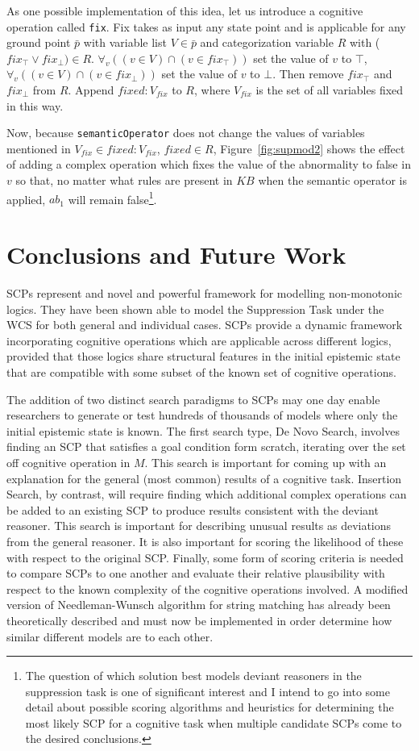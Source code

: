 \documentclass{article}
\begin{document}
 As one possible implementation of this idea, let us introduce a cognitive operation called \texttt{fix}. Fix takes as input any state point and is applicable for any ground point $\bar{p}$ with variable list $V \in \bar{p}$ and categorization variable $R$ with ($fix_\top \lor fix_\bot) \in R$. $\forall_v( (v \in V) \cap (v \in fix_\top))$ set the value of $v$ to $\top$, $\forall_v( (v \in V) \cap (v \in fix_\bot))$ set the value of $v$ to $\bot$. Then remove $fix_\top$ and $fix_\bot$ from $R$. Append $fixed:V_{fix}$ to $R$, where $V_{fix}$ is the set of all variables fixed in this way.

Now, because \texttt{semanticOperator} does not change the values of variables mentioned in $V_{fix} \in fixed:V_{fix}$, $fixed \in R$, Figure~\ref{fig:supmod2} shows the effect of adding a complex operation which fixes the value of the abnormality to false in $v$ so that, no matter what rules are present in $KB$ when the semantic operator is applied, $ab_1$ will remain false\footnote{The question of which solution best models deviant reasoners in the suppression task is one of significant interest and I intend to go into some detail about possible scoring algorithms and heuristics for determining the most likely SCP for a cognitive task when multiple candidate SCPs come to the desired conclusions.}.

\section{Conclusions and Future Work}
SCPs represent and novel and powerful framework for modelling non-monotonic logics. They have been shown able to model the Suppression Task under the WCS for both general and individual cases. SCPs provide a dynamic framework incorporating cognitive operations which are applicable across different logics, provided that those logics share structural features in the initial epistemic state that are compatible with some subset of the known set of cognitive operations.

The addition of two distinct search paradigms to SCPs may one day enable researchers to generate or test hundreds of thousands of models where only the initial epistemic state is known. The first search type, De Novo Search, involves finding an SCP that satisfies a goal condition form scratch, iterating over the set off cognitive operation in $M$. This search is important for coming up with an explanation for the general (most common) results of a cognitive task. Insertion Search, by contrast, will require finding which additional complex operations can be added to an existing SCP to produce results consistent with the deviant reasoner. This search is important for describing unusual results as deviations from the general reasoner. It is also important for scoring the likelihood of these with respect to the original SCP. Finally, some form of scoring criteria is needed to compare SCPs to one another and evaluate their relative plausibility with respect to the known complexity of the cognitive operations involved. A modified version of Needleman-Wunsch algorithm for string matching has already been theoretically described and must now be implemented in order determine how similar different models are to each other.
\end{document}
